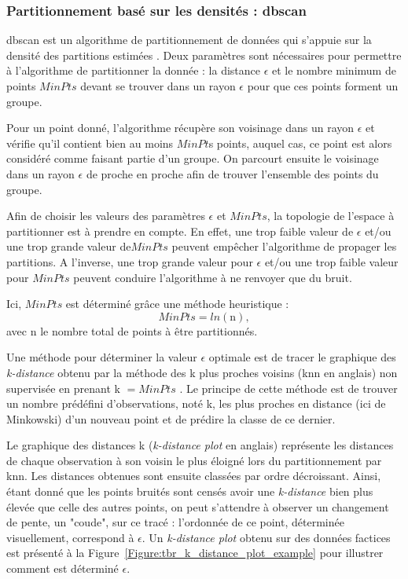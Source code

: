 \subsubsection{Partitionnement basé sur les densités : \gls{dbscan}}
\gls{dbscan} est un algorithme de partitionnement de données qui s'appuie sur la densité des partitions estimées \citep{Ester1996}. 
Deux paramètres sont nécessaires pour permettre à l'algorithme de partitionner la donnée : la distance $\epsilon$ et le nombre minimum de points 
$MinPts$ devant se trouver dans un rayon $\epsilon$ pour que ces points forment un groupe.
 
Pour un point donné, l'algorithme récupère son voisinage dans un rayon $\epsilon$ et vérifie qu'il contient bien au moins $MinPt$s points, auquel cas, 
ce point est alors considéré comme faisant partie d'un groupe. On parcourt ensuite le voisinage 
dans un rayon $\epsilon$ de proche en proche afin de trouver l'ensemble des points du groupe.

Afin de choisir les valeurs des paramètres $\epsilon$ et $MinPts$, la topologie de l'espace à partitionner est à prendre en compte. En effet, une 
trop faible valeur de $\epsilon$  et/ou une trop grande valeur de$MinPts$ peuvent empêcher 
l'algorithme de propager les partitions. A l'inverse, une trop grande valeur pour $\epsilon$  
et/ou une trop faible valeur pour $MinPts$ peuvent conduire l'algorithme à ne renvoyer que du bruit. 
 
Ici, $MinPts$ est déterminé grâce une méthode heuristique \citep{Birant2007} :
\begin{equation}
\label{eq:tbr_dbscan}
MinPts = ln(\text{n}),
\end{equation}
avec n le nombre total de points à être partitionnés.

Une méthode pour déterminer la valeur $\epsilon$ optimale est de tracer le graphique des \textit{k-distance} obtenu par la méthode des k plus proches voisins 
(\gls{knn} en anglais) non supervisée en prenant k $= MinPts$ \citep{Goldberger2005, Ester1996}. Le principe de cette méthode
est de trouver un nombre prédéfini d'observations, noté k, les plus proches en distance (ici de Minkowski) d'un nouveau point et de prédire la classe de ce dernier. 

Le graphique des distances k (\textit{k-distance plot} en anglais) représente les distances de chaque observation à son voisin le plus éloigné 
lors du partitionnement par \gls{knn}. Les distances obtenues sont ensuite classées par ordre décroissant. 
Ainsi, étant donné que les points bruités sont censés avoir une \textit{k-distance} bien plus élevée que celle des autres points, on peut 
s'attendre à observer un changement de pente, un "coude", sur ce tracé : l'ordonnée de ce point, déterminée visuellement, correspond à $\epsilon$. Un \textit{k-distance plot}
obtenu sur des données factices est présenté à la Figure~\ref{Figure:tbr_k_distance_plot_example} pour illustrer comment est déterminé $\epsilon$. 

